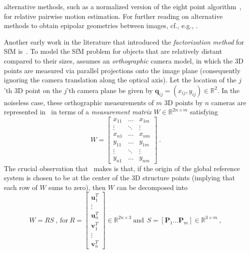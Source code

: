 \documentclass[10pt]{article}
\newcommand{\R}{\ensuremath{\mathbb{R}}}
\begin{document}
alternative methods, such as a normalized version of the eight point algorithm~\cite{HartleyEightPnt}, for relative pairwise motion estimation. For further reading on alternative methods to obtain epipolar geometries between images, cf., e.g., \cite{EpipolarReview,HartleyBook}.

Another early work in the literature that introduced the \textit{factorization method} for SfM is~\cite{TomasiKanadeFactor}. To model the SfM problem for objects that are relatively distant compared to their sizes, \cite{TomasiKanadeFactor} assumes an \textit{orthographic} camera model, in which the $3$D points are measured via parallel projections onto the image plane (consequently ignoring the camera translation along the optical axis). Let the location of the $j$'th $3$D point on the $j$'th camera plane be given by $\mathbf{q}_{ij} = (x_{ij},y_{ij})\in\R^2$. In the noiseless case, these orthographic measurements of $m$ $3$D points by $n$ cameras are represented in~\cite{TomasiKanadeFactor} in terms of a \textit{measurement matrix} $W\in\R^{2n\times m}$ satisfying
\begin{equation}
\label{eq:FactorMeasMatrix}
W =  \left[\begin{matrix} x_{11} & \hdots & x_{1m} \\ \vdots & \ddots & \vdots \\ x_{n1} & \hdots & x_{nm} \\ y_{11} & \hdots & y_{1m} \\ \vdots & \ddots & \vdots \\ y_{n1} & \hdots & y_{nm} \end{matrix}\right] \ .
\end{equation}
The crucial observation that~\cite{TomasiKanadeFactor} makes is that, if the origin of the global reference system is chosen to be at the center of the $3$D structure points (implying that each row of $W$ sums to zero), then $W$ can be decomposed into 
\begin{equation}
\label{eq:MeasMtxFactor}
W = RS \ , \ \mbox{for} \ R = \left[\begin{matrix}\mathbf{u}_1^T\\ \vdots \\ \mathbf{u}_n^T \\ \mathbf{v}_1^T\\ \vdots \\ \mathbf{v}_n^T \end{matrix}\right] \in \R^{2n\times3} \ \mbox{and} \ \ S = \left[\mathbf{P}_1 \hdots \mathbf{P}_m\right] \in\R^{3\times m} \ ,
\end{equation}
\end{document}
